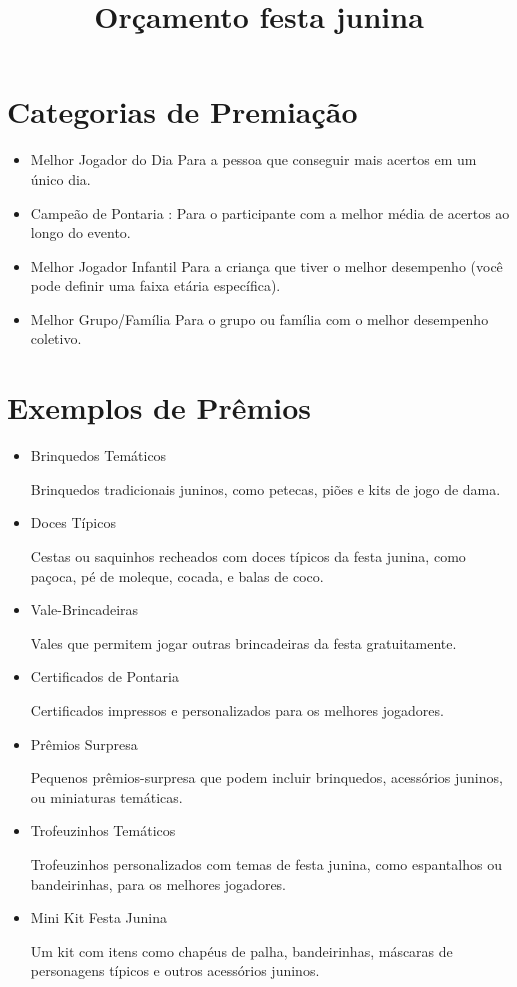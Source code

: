 \documentclass{article}
\date{}
\title{Orçamento festa junina}
\begin{document}
\maketitle
\tableofcontents
\newpage
\section{Categorias de Premiação}
\begin{itemize}
    \item Melhor Jogador do Dia
    Para a pessoa que conseguir mais acertos em um único dia.
    
    \item Campeão de Pontaria : Para o participante com a melhor média de acertos ao longo do evento.
    
    \item Melhor Jogador Infantil
    Para a criança que tiver o melhor desempenho (você pode definir uma faixa etária específica).
    \item Melhor Grupo/Família
    Para o grupo ou família com o melhor desempenho coletivo.
\end{itemize}





\section{Exemplos de Prêmios}
\begin{itemize}
    \item Brinquedos Temáticos

    Brinquedos tradicionais juninos, como petecas, piões e kits de jogo de dama.
    \item Doces Típicos

    Cestas ou saquinhos recheados com doces típicos da festa junina, como paçoca, pé de moleque, cocada, e balas de coco.
    \item Vale-Brincadeiras

    Vales que permitem jogar outras brincadeiras da festa gratuitamente.
    \item Certificados de Pontaria

    Certificados impressos e personalizados para os melhores jogadores.
    \item Prêmios Surpresa

    Pequenos prêmios-surpresa que podem incluir brinquedos, acessórios juninos, ou miniaturas temáticas.
    \item Trofeuzinhos Temáticos

    Trofeuzinhos personalizados com temas de festa junina, como espantalhos ou bandeirinhas, para os melhores jogadores.
    \item Mini Kit Festa Junina

    Um kit com itens como chapéus de palha, bandeirinhas, máscaras de personagens típicos e outros acessórios juninos.
\end{itemize}
\end{document}
